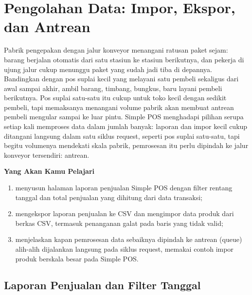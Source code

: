 
\chapter{Pengolahan Data: Impor, Ekspor, dan Antrean}
\label{ch:pengolahan-data}


Pabrik pengepakan dengan jalur konveyor menangani ratusan paket sejam:
barang berjalan otomatis dari satu stasiun ke stasiun berikutnya, dan
pekerja di ujung jalur cukup menunggu paket yang sudah jadi tiba di
depannya. Bandingkan dengan pos suplai kecil yang melayani satu pembeli
sekaligus dari awal sampai akhir, ambil barang, timbang, bungkus, baru
layani pembeli berikutnya. Pos suplai satu-satu itu cukup untuk toko
kecil dengan sedikit pembeli, tapi memaksanya menangani volume pabrik
akan membuat antrean pembeli mengular sampai ke luar pintu. Simple POS
menghadapi pilihan serupa setiap kali memproses data dalam jumlah
banyak: laporan dan impor kecil cukup ditangani langsung dalam satu
siklus request, seperti pos suplai satu-satu, tapi begitu volumenya
mendekati skala pabrik, pemrosesan itu perlu dipindah ke jalur konveyor
tersendiri: antrean.

\textbf{Yang Akan Kamu Pelajari}

\begin{enumerate}
  \item menyusun halaman laporan penjualan Simple POS dengan filter rentang tanggal dan total penjualan yang dihitung dari data transaksi;
  \item mengekspor laporan penjualan ke CSV dan mengimpor data produk dari berkas CSV, termasuk penanganan galat pada baris yang tidak valid;
  \item menjelaskan kapan pemrosesan data sebaiknya dipindah ke antrean (queue) alih-alih dijalankan langsung pada siklus request, memakai contoh impor produk berskala besar pada Simple POS.
\end{enumerate}

\section{Laporan Penjualan dan Filter Tanggal}
\label{sec:pengolahan-data-1}

